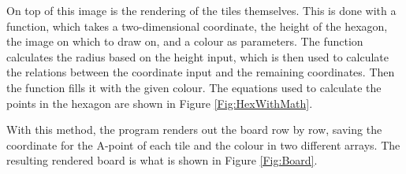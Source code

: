 On top of this image is the rendering of the tiles themselves. This is done with a function, which takes a two-dimensional coordinate, the height of the hexagon, the image on which to draw on, and a colour as parameters. The function calculates the radius based on the height input, which is then used to calculate the relations between the coordinate input and the remaining coordinates. Then the function fills it with the given colour. The equations used to calculate the points in the hexagon are shown in Figure \ref{Fig:HexWithMath}.

With this method, the program renders out the board row by row, saving the coordinate for the A-point of each tile and the colour in two different arrays. The resulting rendered board is what is shown in Figure \ref{Fig:Board}.
